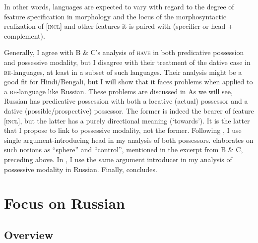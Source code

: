 \documentclass[output=paper,colorlinks,citecolor=brown]{./langscibook}
\begin{document}
In other words, languages are expected to vary with regard to the degree of feature specification in morphology and the locus of the morphosyntactic realization of [\textsc{incl]} and other features it is paired with (specifier or head + complement).   

Generally, I agree with B \& C’s analysis of \textsc{have} in both predicative possession and possessive modality, but I disagree with their treatment of the dative case in \textsc{be}{}-languages, at least in a subset of such languages. Their analysis might be a good fit for Hindi/Bengali, but I will show that it faces problems when applied to a \textsc{be}{}-language like Russian. These problems are discussed in  As we will see, Russian has predicative possession with both a locative (actual) possessor and a dative (possible/prospective) possessor. The former is indeed the bearer of feature [\textsc{incl}], but the latter has a purely directional meaning (‘towards’). It is the latter that I propose to link to possessive modality, not the former. Following \citet{TsedrykInPress}, I use  single argument-introducing head in my analysis of both possessors.  elaborates on such notions as “sphere” and “control”, mentioned in the excerpt from B \& C, preceding  above. In , I use the same argument introducer in my analysis of possessive modality in Russian. Finally,  concludes. 

\section{ Focus on Russian}\label{sec:tsedryk:2}

\subsection{Overview}\label{sec:tsedryk:2.1}
\end{document}
